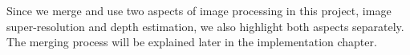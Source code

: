 Since we merge and use two aspects of image processing in this project, image super-resolution and depth estimation, we also highlight both aspects separately.
The merging process will be explained later in the implementation chapter.